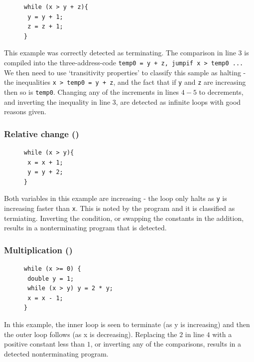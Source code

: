 \documentclass[12pt,a4paper]{article}
\begin{document}
\begin{enumerate}
\begin{figure}
\centering
\begin{lstlisting}[frame=tlrb,language=myLang]
while (x > y + z){
 y = y + 1;
 z = z + 1;
}
\end{lstlisting}
\end{figure}
This example was correctly detected as terminating.
The comparison in line $3$ is compiled into the three-address-code \texttt{temp0 = y + z, jumpif x > temp0 ...}
We then need to use `transitivity properties' to classify this sample as halting - the inequalities \texttt{x > temp0 = y + z},
and the fact that if \texttt{y} and \texttt{z} are increasing then so is \texttt{temp0}.
Changing any of the increments in lines $4-5$ to decrements, and inverting the inequality in line $3$, are detected as infinite loops with good reasons given.

\subsubsection{Relative change (\cite[AAAA]{tra})}

\begin{figure}
\centering
\begin{lstlisting}[frame=tlrb,language=myLang]
while (x > y){
 x = x + 1;
 y = y + 2;
}
\end{lstlisting}
\end{figure}
Both variables in this example are increasing - the loop only halts as \texttt{y} is increasing faster than \texttt{x}.
This is noted by the program and it is classified as termiating. Inverting the condition, or swapping the constants in the addition,
results in a nonterminating program that is detected.

\subsubsection{Multiplication (\cite[C.1]{tra})}

\begin{figure}
\centering
\begin{lstlisting}[frame=tlrb,language=myLang]
while (x >= 0) {
 double y = 1;
 while (x > y) y = 2 * y;
 x = x - 1;
}
\end{lstlisting}
\end{figure}
In this example, the inner loop is seen to terminate (as y is increasing) and then the outer loop follows (as x is decreasing).
Replacing the $2$ in line $4$ with a positive constant less than $1$, or inverting any of the comparisons, results in a detected nonterminating program.


\end{enumerate}
\end{document}

